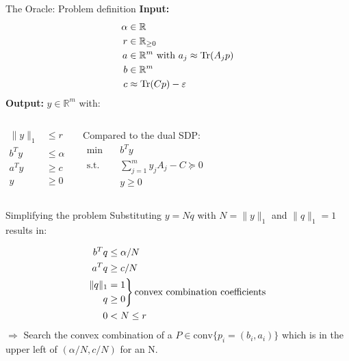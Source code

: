 \begin{frame}{The Oracle: Problem definition}
\textbf{Input: }
\begin{align*}
\alpha&\in\mathbb{R}\\
r&\in \mathbb{R}_{\geq 0}\\
a&\in \mathbb{R}^m \text{ with } a_j\approx \operatorname{Tr}(A_j p)\\
b&\in \mathbb{R}^m\\
c&\approx \operatorname{Tr}(Cp)-\varepsilon
\end{align*}
\textbf{Output: } $y\in \mathbb{R}^m$ with:
\begin{columns}
\begin{align*}
\|y\|_1&\leq r\\
b^T y&\leq \alpha\\
a^T y&\geq c\\
y&\geq 0
\end{align*}
\begin{block}{Compared to the dual SDP:}
\begin{align*}
\min\quad&b^T y\\
\text{s.t. }&\sum_{j=1}^m y_j A_j - C\succeq 0\\
&y\geq 0
\end{align*}
\end{block}

\end{columns}
\end{frame}

\begin{frame}{Simplifying the problem}
Substituting $y=Nq$ with $N=\|y\|_1$ and $\|q\|_1=1$ results in:

\begin{equation*}
 \begin{split}
  b^T q&\leq \alpha/N\\
  a^T q&\geq c/N\\
  \begin{aligned}
   \|q\|_1\\
   q
  \end{aligned}
  &
  \begin{rcases*}
   =1\\
   \geq 0
  \end{rcases*} \text{convex combination coefficients}  \\
  0&<N\leq r
 \end{split}
\end{equation*}
\pause
$\Rightarrow$ Search the convex combination of a $P\in\mathrm{conv}\{p_i=(b_i,a_i)\}$ which is in the upper left of $(\alpha/N, c/N)$ for an N.

\end{frame}

